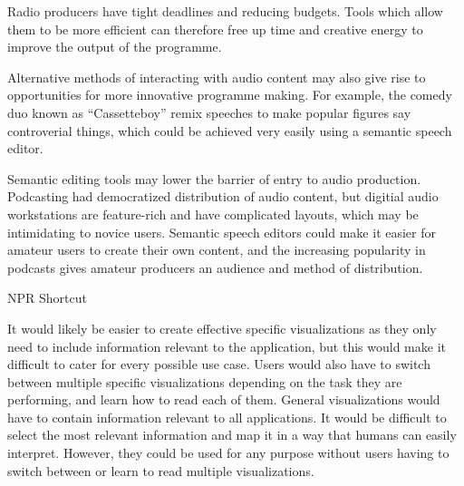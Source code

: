   Radio producers have tight deadlines and reducing budgets. Tools which allow them to be more efficient can therefore
  free up time and creative energy to improve the output of the programme.

  Alternative methods of interacting with audio content may also give rise to opportunities for more innovative programme
  making.
  For example, the comedy duo known as ``Cassetteboy'' \citep{Perraudin2014} remix speeches to make popular figures say
  controverial things, which could be achieved very easily using a semantic speech editor.

  Semantic editing tools may lower the barrier of entry to audio production.
  Podcasting had democratized distribution of audio content, but digitial audio workstations are feature-rich
  and have complicated layouts, which may be intimidating to novice users.
  Semantic speech editors could make it easier for amateur users to create their own content, and the increasing
  popularity in podcasts gives amateur producers an audience and method of distribution.

  NPR Shortcut\citet{Friedhoff2016}






It would likely be easier to create effective specific visualizations as they
only need to include information relevant to the application, but this would make it difficult to cater for every
possible use case. Users would also have to switch between multiple specific visualizations depending on the task they
are performing, and learn how to read each of them. General visualizations would have to contain information relevant
to all applications. It would be difficult to select the most relevant information and map it in a way that humans can
easily interpret. However, they could be used for any purpose without users having to switch between or learn to read
multiple visualizations.







